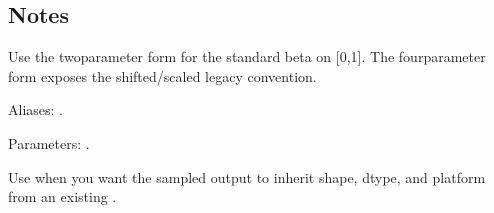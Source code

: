 \documentclass[letterpaper,10pt,english]{sphinxmanual}
\begin{document}
\begin{sphinxVerbatim}[commandchars=\\\{\}]
\end{sphinxVerbatim}


\subsection{Notes}
\label{\detokenize{distribution_catalog:id17}}
\sphinxAtStartPar
Use the two\sphinxhyphen{}parameter form for the standard beta on {[}0,1{]}. The four\sphinxhyphen{}parameter form exposes the shifted/scaled legacy convention.

\sphinxAtStartPar
Aliases: .

\sphinxAtStartPar
Parameters: .

\sphinxAtStartPar
Use  when you want the sampled output to inherit shape, dtype, and platform from an existing .
\end{document}
